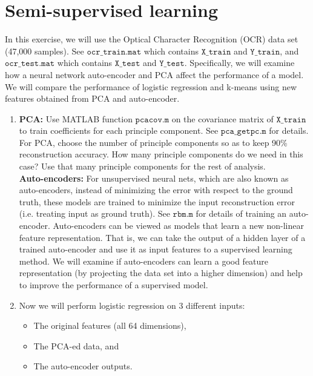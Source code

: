 \section{Semi-supervised learning }

In this exercise, we will use the Optical Character Recognition (OCR) data set (47,000 samples).
See \(\mathtt{ocr\_train.mat}\) which contains \(\mathtt{X\_train}\)  and \(\mathtt{Y\_train}\), and  \(\mathtt{ocr\_test.mat}\) which contains \(\mathtt{X\_test}\)  and \(\mathtt{Y\_test}\).
Specifically, we will examine how a neural network auto-encoder and PCA affect the performance of a model. 
We will compare the performance of logistic regression and k-means using new features obtained from PCA and auto-encoder.

\begin{enumerate}
\item {} \textbf{PCA:}
Use MATLAB function \(\mathtt{pcacov.m}\) on the covariance matrix of  \(\mathtt{X\_train}\) to train coefficients for each principle component. 
See \(\mathtt{pca\_getpc.m}\) for details.
For PCA, choose the number of principle components so as to keep 90\% reconstruction accuracy.
How many principle components do we need in this case? 
Use that many principle components for the rest of analysis. \\

\textbf{Auto-encoders:}
For unsupervised neural nets, which are also known as auto-encoders,
instead of minimizing the error with respect to the ground truth, these models are trained to minimize the input reconstruction error (i.e. treating input as ground truth). 
See \(\mathtt{rbm.m}\) for details of training an auto-encoder. 
Auto-encoders can be viewed as models that learn a new non-linear feature representation. 
That is, we can take the output of a hidden layer of a trained auto-encoder and use it as input features to a supervised learning method. 
We will examine if auto-encoders can learn a good feature representation (by projecting the data set into a higher dimension) and help to improve the performance of a supervised model.


\item {} Now we will perform logistic regression on 3 different inputs:
\begin{itemize}
\item The original features (all 64 dimensions),
\item The PCA-ed data, and 
\item The auto-encoder outputs. 
\end{itemize}


\end{enumerate}
